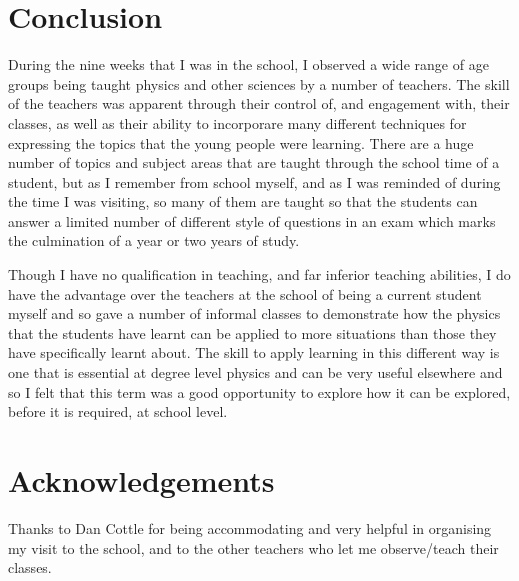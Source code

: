 \section{Conclusion} %
\label{sec:Conclusion}
    During the nine weeks that I was in the school, I observed a wide range of age groups being taught physics and other sciences by a number of teachers. The skill of the teachers was apparent through their control of, and engagement with, their classes, as well as their ability to incorporare many different techniques for expressing the topics that the young people were learning. There are a huge number of topics and subject areas that are taught through the school time of a student, but as I remember from school myself, and as I was reminded of during the time I was visiting, so many of them are taught so that the students can answer a limited number of different style of questions in an exam which marks the culmination of a year or two years of study.

    Though I have no qualification in teaching, and far inferior teaching abilities, I do have the advantage over the teachers at the school of being a current student myself and so gave a number of informal classes to demonstrate how the physics that the students have learnt can be applied to more situations than those they have specifically learnt about. The skill to apply learning in this different way is one that is essential at degree level physics and can be very useful elsewhere and so I felt that this term was a good opportunity to explore how it can be explored, before it is required, at school level. 

\section{Acknowledgements} %
\label{sec:Acknowlegements}
    Thanks to Dan Cottle for being accommodating and very helpful in organising my visit to the school, and to the other teachers who let me observe/teach their classes.
